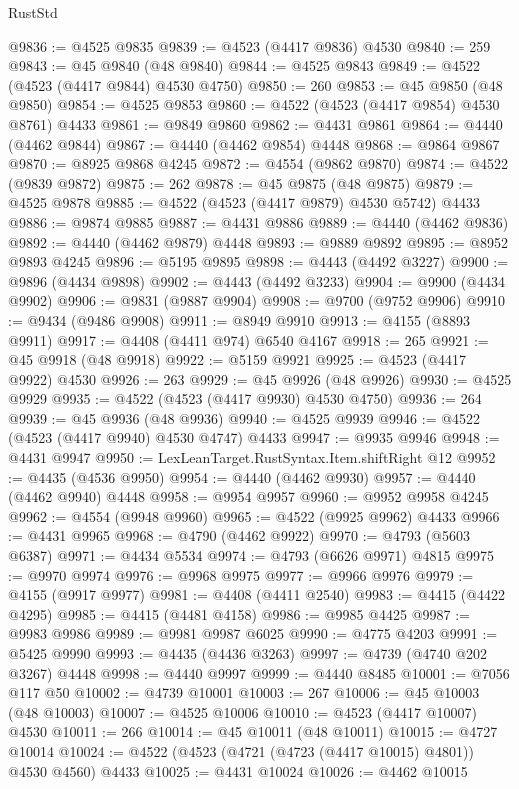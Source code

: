 \begin{lexlean}{RustStd}
\begin{coremodule}
@9836 := @4525 @9835
@9839 := @4523 (@4417 @9836) @4530
@9840 := 259
@9843 := @45 @9840 (@48 @9840)
@9844 := @4525 @9843
@9849 := @4522 (@4523 (@4417 @9844) @4530 @4750)
@9850 := 260
@9853 := @45 @9850 (@48 @9850)
@9854 := @4525 @9853
@9860 := @4522 (@4523 (@4417 @9854) @4530 @8761) @4433
@9861 := @9849 @9860
@9862 := @4431 @9861
@9864 := @4440 (@4462 @9844)
@9867 := @4440 (@4462 @9854) @4448
@9868 := @9864 @9867
@9870 := @8925 @9868 @4245
@9872 := @4554 (@9862 @9870)
@9874 := @4522 (@9839 @9872)
@9875 := 262
@9878 := @45 @9875 (@48 @9875)
@9879 := @4525 @9878
@9885 := @4522 (@4523 (@4417 @9879) @4530 @5742) @4433
@9886 := @9874 @9885
@9887 := @4431 @9886
@9889 := @4440 (@4462 @9836)
@9892 := @4440 (@4462 @9879) @4448
@9893 := @9889 @9892
@9895 := @8952 @9893 @4245
@9896 := @5195 @9895
@9898 := @4443 (@4492 @3227)
@9900 := @9896 (@4434 @9898)
@9902 := @4443 (@4492 @3233)
@9904 := @9900 (@4434 @9902)
@9906 := @9831 (@9887 @9904)
@9908 := @9700 (@9752 @9906)
@9910 := @9434 (@9486 @9908)
@9911 := @8949 @9910
@9913 := @4155 (@8893 @9911)
@9917 := @4408 (@4411 @974) @6540 @4167
@9918 := 265
@9921 := @45 @9918 (@48 @9918)
@9922 := @5159 @9921
@9925 := @4523 (@4417 @9922) @4530
@9926 := 263
@9929 := @45 @9926 (@48 @9926)
@9930 := @4525 @9929
@9935 := @4522 (@4523 (@4417 @9930) @4530 @4750)
@9936 := 264
@9939 := @45 @9936 (@48 @9936)
@9940 := @4525 @9939
@9946 := @4522 (@4523 (@4417 @9940) @4530 @4747) @4433
@9947 := @9935 @9946
@9948 := @4431 @9947
@9950 := LexLeanTarget.RustSyntax.Item.shiftRight @12
@9952 := @4435 (@4536 @9950)
@9954 := @4440 (@4462 @9930)
@9957 := @4440 (@4462 @9940) @4448
@9958 := @9954 @9957
@9960 := @9952 @9958 @4245
@9962 := @4554 (@9948 @9960)
@9965 := @4522 (@9925 @9962) @4433
@9966 := @4431 @9965
@9968 := @4790 (@4462 @9922)
@9970 := @4793 (@5603 @6387)
@9971 := @4434 @5534
@9974 := @4793 (@6626 @9971) @4815
@9975 := @9970 @9974
@9976 := @9968 @9975
@9977 := @9966 @9976
@9979 := @4155 (@9917 @9977)
@9981 := @4408 (@4411 @2540)
@9983 := @4415 (@4422 @4295)
@9985 := @4415 (@4481 @4158)
@9986 := @9985 @4425
@9987 := @9983 @9986
@9989 := @9981 @9987 @6025
@9990 := @4775 @4203
@9991 := @5425 @9990
@9993 := @4435 (@4436 @3263)
@9997 := @4739 (@4740 @202 @3267) @4448
@9998 := @4440 @9997
@9999 := @4440 @8485
@10001 := @7056 @117 @50
@10002 := @4739 @10001
@10003 := 267
@10006 := @45 @10003 (@48 @10003)
@10007 := @4525 @10006
@10010 := @4523 (@4417 @10007) @4530
@10011 := 266
@10014 := @45 @10011 (@48 @10011)
@10015 := @4727 @10014
@10024 := @4522 (@4523 (@4721 (@4723 (@4417 @10015) @4801)) @4530 @4560) @4433
@10025 := @4431 @10024
@10026 := @4462 @10015

\end{coremodule}
\end{lexlean}
